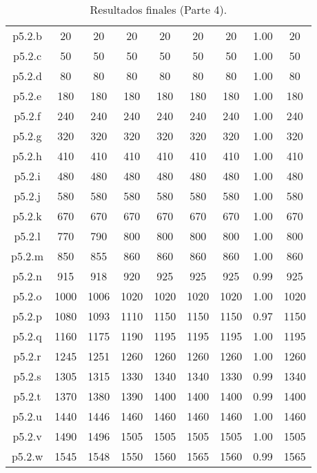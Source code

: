 \begin{table}
\begin{center}
\begin{tabular}{ |c|c|c|c|c|c|c|c|c| }
p5.2.b & 20 & 20 & 20 & 20 & 20 & 20 & 1.00 & 20  \\
p5.2.c & 50 & 50 & 50 & 50 & 50 & 50 & 1.00 & 50  \\
p5.2.d & 80 & 80 & 80 & 80 & 80 & 80 & 1.00 & 80  \\
p5.2.e & 180 & 180 & 180 & 180 & 180 & 180 & 1.00 & 180  \\
p5.2.f & 240 & 240 & 240 & 240 & 240 & 240 & 1.00 & 240  \\
p5.2.g & 320 & 320 & 320 & 320 & 320 & 320 & 1.00 & 320  \\
p5.2.h & 410 & 410 & 410 & 410 & 410 & 410 & 1.00 & 410  \\
p5.2.i & 480 & 480 & 480 & 480 & 480 & 480 & 1.00 & 480  \\
p5.2.j & 580 & 580 & 580 & 580 & 580 & 580 & 1.00 & 580  \\
p5.2.k & 670 & 670 & 670 & 670 & 670 & 670 & 1.00 & 670  \\
p5.2.l & 770 & 790 & 800 & 800 & 800 & 800 & 1.00 & 800  \\
p5.2.m & 850 & 855 & 860 & 860 & 860 & 860 & 1.00 & 860  \\
p5.2.n & 915 & 918 & 920 & 925 & 925 & 925 & 0.99 & 925  \\
p5.2.o & 1000 & 1006 & 1020 & 1020 & 1020 & 1020 & 1.00 & 1020  \\
p5.2.p & 1080 & 1093 & 1110 & 1150 & 1150 & 1150 & 0.97 & 1150  \\
p5.2.q & 1160 & 1175 & 1190 & 1195 & 1195 & 1195 & 1.00 & 1195  \\
p5.2.r & 1245 & 1251 & 1260 & 1260 & 1260 & 1260 & 1.00 & 1260  \\
p5.2.s & 1305 & 1315 & 1330 & 1340 & 1340 & 1330 & 0.99 & 1340  \\
p5.2.t & 1370 & 1380 & 1390 & 1400 & 1400 & 1400 & 0.99 & 1400  \\
p5.2.u & 1440 & 1446 & 1460 & 1460 & 1460 & 1460 & 1.00 & 1460  \\
p5.2.v & 1490 & 1496 & 1505 & 1505 & 1505 & 1505 & 1.00 & 1505  \\
p5.2.w & 1545 & 1548 & 1550 & 1560 & 1565 & 1560 & 0.99 & 1565  \\
\hline
\end{tabular}
\end{center}
\caption{Resultados finales (Parte 4).}
\label{tab:resultadosFinales4}
\end{table}



